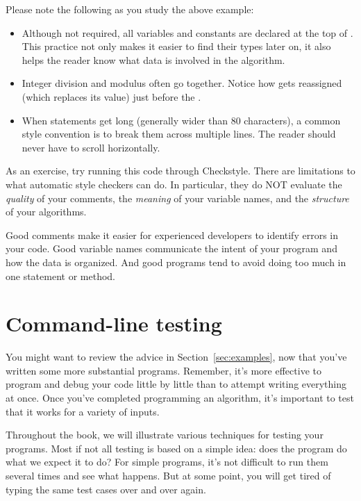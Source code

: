 Please note the following as you study the above example:

\begin{itemize}

\item Although not required, all variables and constants are declared at the top of .
This practice not only makes it easier to find their types later on, it also helps the reader know what data is involved in the algorithm.

\item Integer division and modulus often go together.
Notice how  gets reassigned (which replaces its value) just before the .

\item When statements get long (generally wider than 80 characters), a common style convention is to break them across multiple lines.
The reader should never have to scroll horizontally.

\end{itemize}

As an exercise, try running this code through Checkstyle.
There are limitations to what automatic style checkers can do.
In particular, they do NOT evaluate the {\em quality} of your comments, the {\em meaning} of your variable names, and the {\em structure} of your algorithms.

Good comments make it easier for experienced developers to identify errors in your code.
Good variable names communicate the intent of your program and how the data is organized.
And good programs tend to avoid doing too much in one statement or method.


\section{Command-line testing}

You might want to review the advice in Section~\ref{sec:examples}, now that you've written some more substantial programs.
Remember, it's more effective to program and debug your code little by little than to attempt writing everything at once.
Once you've completed programming an algorithm, it's important to test that it works for a variety of inputs.

Throughout the book, we will illustrate various techniques for testing your programs.
Most if not all testing is based on a simple idea: does the program do what we expect it to do?
For simple programs, it's not difficult to run them several times and see what happens.
But at some point, you will get tired of typing the same test cases over and over again.

